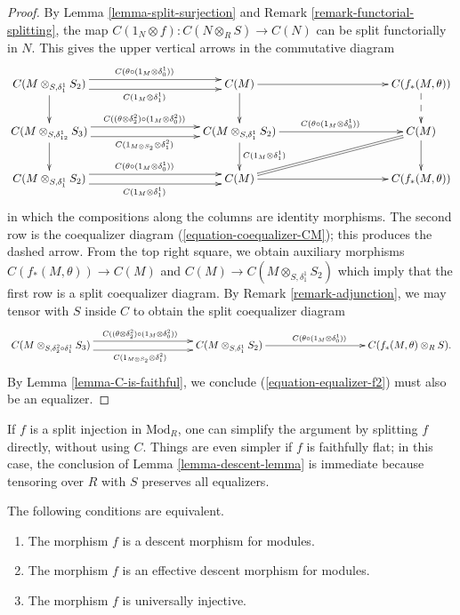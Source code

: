 \begin{proof}
By
Lemma \ref{lemma-split-surjection} and
Remark \ref{remark-functorial-splitting},
the map $C(1_N \otimes f): C(N \otimes_R S) \to C(N)$ can be split functorially 
in $N$. This gives the upper vertical arrows in the commutative diagram
$$
\xymatrix@C=8pc{
C(M \otimes_{S, \delta_1^1} S_2)
\ar@<1ex>^{C(\theta \circ (1_M \otimes \delta_0^1))}[r]
\ar@<-1ex>_{C(1_M \otimes \delta_1^1)}[r] \ar[d] &
C(M) \ar[r]\ar[d] & C(f_*(M,\theta)) \ar@{-->}[d] \\
C(M \otimes_{S,\delta_{12}^1} S_3)
\ar@<1ex>^{C((\theta \otimes \delta_2^2) \circ (1_M \otimes \delta^2_0))}[r]
\ar@<-1ex>_{C(1_{M \otimes S_2} \otimes \delta^2_1)}[r] \ar[d] &
C(M \otimes_{S, \delta_1^1} S_2 )
\ar[r]^{C(\theta \circ (1_M \otimes \delta_0^1))}
\ar[d]^{C(1_M \otimes \delta_1^1)} &
C(M) \ar[d] \ar@{=}[dl] \\
C(M \otimes_{S, \delta_1^1} S_2)
\ar@<1ex>[r]^{C(\theta \circ (1_M \otimes \delta_0^1))}
\ar@<-1ex>[r]_{C(1_M \otimes \delta_1^1)} &
C(M) \ar[r] &
C(f_*(M,\theta))
}
$$
in which the compositions along the columns are identity morphisms.
The second row is the coequalizer diagram
(\ref{equation-coequalizer-CM}); this produces the dashed arrow.
From the top right square, we obtain auxiliary morphisms $C(f_*(M,\theta)) \to 
C(M)$ 
and $C(M) \to C(M\otimes_{S,\delta_1^1} S_2)$ which imply that the first row is 
a split coequalizer diagram.
By Remark \ref{remark-adjunction}, we may tensor with $S$ inside $C$ to obtain 
the split coequalizer diagram
$$
\xymatrix@C=8pc{
C(M \otimes_{S,\delta_2^2 \circ \delta_1^1} S_3)
\ar@<1ex>^{C((\theta \otimes \delta_2^2) \circ (1_M \otimes \delta^2_0))}[r] 
\ar@<-1ex>_{C(1_{M \otimes S_2} \otimes \delta^2_1)}[r] &
C(M \otimes_{S, \delta_1^1} S_2 )
\ar[r]^{C(\theta \circ (1_M \otimes \delta_0^1))} &
C(f_*(M,\theta) \otimes_R S).
}
$$
By Lemma \ref{lemma-C-is-faithful}, we conclude
(\ref{equation-equalizer-f2}) must also be an equalizer.
\end{proof}

\begin{remark}
\label{remark-descent-lemma}
If $f$ is a split injection in $\text{Mod}_R$, one can simplify the argument by 
splitting $f$ directly,
without using $C$. Things are even simpler if $f$ is faithfully flat; in this 
case,
the conclusion of Lemma \ref{lemma-descent-lemma} 
is immediate because tensoring over $R$ with $S$ preserves all equalizers.
\end{remark}

\begin{theorem}
\label{theorem-descent}
The following conditions are equivalent.
\begin{enumerate}
\item[(a)] The morphism $f$ is a descent morphism for modules.
\item[(b)] The morphism $f$ is an effective descent morphism for modules.
\item[(c)] The morphism $f$ is universally injective.
\end{enumerate}
\end{theorem}

